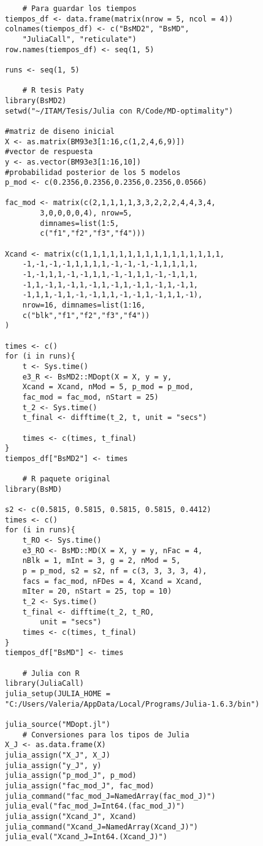 \begin{verbatim}
	# Para guardar los tiempos
tiempos_df <- data.frame(matrix(nrow = 5, ncol = 4))
colnames(tiempos_df) <- c("BsMD2", "BsMD", 
	"JuliaCall", "reticulate")
row.names(tiempos_df) <- seq(1, 5)
	
runs <- seq(1, 5)
	
	# R tesis Paty
library(BsMD2)
setwd("~/ITAM/Tesis/Julia con R/Code/MD-optimality")

#matriz de diseno inicial	
X <- as.matrix(BM93e3[1:16,c(1,2,4,6,9)]) 
#vector de respuesta
y <- as.vector(BM93e3[1:16,10])
#probabilidad posterior de los 5 modelos 
p_mod <- c(0.2356,0.2356,0.2356,0.2356,0.0566) 
	
fac_mod <- matrix(c(2,1,1,1,1,3,3,2,2,2,4,4,3,4,
		3,0,0,0,0,4), nrow=5, 
		dimnames=list(1:5,
		c("f1","f2","f3","f4")))
	
Xcand <- matrix(c(1,1,1,1,1,1,1,1,1,1,1,1,1,1,1,1,
	-1,-1,-1,-1,1,1,1,1,-1,-1,-1,-1,1,1,1,1,
	-1,-1,1,1,-1,-1,1,1,-1,-1,1,1,-1,-1,1,1,
	-1,1,-1,1,-1,1,-1,1,-1,1,-1,1,-1,1,-1,1,
	-1,1,1,-1,1,-1,-1,1,1,-1,-1,1,-1,1,1,-1),
	nrow=16, dimnames=list(1:16,
	c("blk","f1","f2","f3","f4"))
)
	
times <- c()
for (i in runs){
	t <- Sys.time()
	e3_R <- BsMD2::MDopt(X = X, y = y, 
	Xcand = Xcand, nMod = 5, p_mod = p_mod, 
	fac_mod = fac_mod, nStart = 25)
	t_2 <- Sys.time()
	t_final <- difftime(t_2, t, unit = "secs")
		
	times <- c(times, t_final)
}
tiempos_df["BsMD2"] <- times
	
	# R paquete original
library(BsMD)

s2 <- c(0.5815, 0.5815, 0.5815, 0.5815, 0.4412)
times <- c()
for (i in runs){
	t_RO <- Sys.time()
	e3_RO <- BsMD::MD(X = X, y = y, nFac = 4, 
	nBlk = 1, mInt = 3, g = 2, nMod = 5, 
	p = p_mod, s2 = s2, nf = c(3, 3, 3, 3, 4), 
	facs = fac_mod, nFDes = 4, Xcand = Xcand, 
	mIter = 20, nStart = 25, top = 10)
	t_2 <- Sys.time() 
	t_final <- difftime(t_2, t_RO, 
		unit = "secs")
	times <- c(times, t_final)
}
tiempos_df["BsMD"] <- times
	
	# Julia con R
library(JuliaCall)
julia_setup(JULIA_HOME =
"C:/Users/Valeria/AppData/Local/Programs/Julia-1.6.3/bin")
	
julia_source("MDopt.jl")
	# Conversiones para los tipos de Julia
X_J <- as.data.frame(X)
julia_assign("X_J", X_J)
julia_assign("y_J", y)
julia_assign("p_mod_J", p_mod)
julia_assign("fac_mod_J", fac_mod)
julia_command("fac_mod_J=NamedArray(fac_mod_J)")
julia_eval("fac_mod_J=Int64.(fac_mod_J)")
julia_assign("Xcand_J", Xcand)
julia_command("Xcand_J=NamedArray(Xcand_J)")
julia_eval("Xcand_J=Int64.(Xcand_J)")
	

\end{verbatim}
